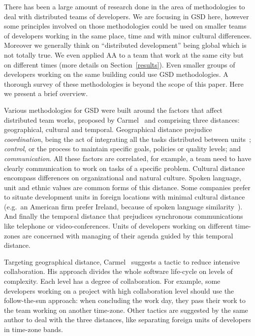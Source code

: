 \documentclass[letterpaper]{article}
\newcommand{\indraftnote}[1]{\textcolor{blue}{\texttt{\footnotesize[#1]}}}
\newcommand{\todo}[1]{\indraftnote{todo: #1}}
\begin{document}


There has been a large amount of research done in the area of methodologies to
deal with distributed teams of developers. We are focusing in GSD here, however
some principles involved on those methodologies could be used on smaller teams
of developers working in the same place, time and with minor cultural
differences. Moreover we generally think on ``distributed development'' being
global which is not totally true. We even applied AA to a team that work at the
same city but on different times (more details on Section~\ref{results}). Even
smaller groups of developers working on the same building could use GSD
methodologies. A thorough survey of these methodologies is beyond the scope of
this paper. Here we present a brief overview.

Various methodologies for GSD were built around the factors that affect
distributed team works, proposed by Carmel~\cite{carmel1999} and comprising
three distances: geographical, cultural and temporal. Geographical distance
prejudice \emph{coordination}, being the act of integrating all the tasks
distributed between units~\cite{carmel2001}; \emph{control}, or the process to
maintain specific goals, policies or quality levels; and
\emph{communication}. All these factors are correlated, for example, a team need
to have clearly communication to work on tasks of a specific problem. Cultural
distance encompass differences on organizational and natural culture. Spoken
language, unit and ethnic values are common forms of this distance. Some
companies prefer to situate development units in foreign locations with minimal
cultural distance (e.g.\ an American firm prefer Ireland, because of spoken
language similarity~\cite{carmel2001}). And finally the temporal distance that
prejudices synchronous communications like telephone or video-conferences. Units
of developers working on different time-zones are concerned with managing of
their agenda guided by this temporal distance.

Targeting geographical distance, Carmel~\cite{carmel2001} suggests a tactic to
reduce intensive collaboration. His approach divides the whole software
life-cycle on levels of complexity. Each level has a degree of
collaboration. For example, some developers working on a project with high
collaboration level should use the follow-the-sun approach: when concluding the
work day, they pass their work to the team working on another time-zone. Other
tactics are suggested by the same author to deal with the three distances, like
separating foreign units of developers in time-zone bands.
\end{document}
